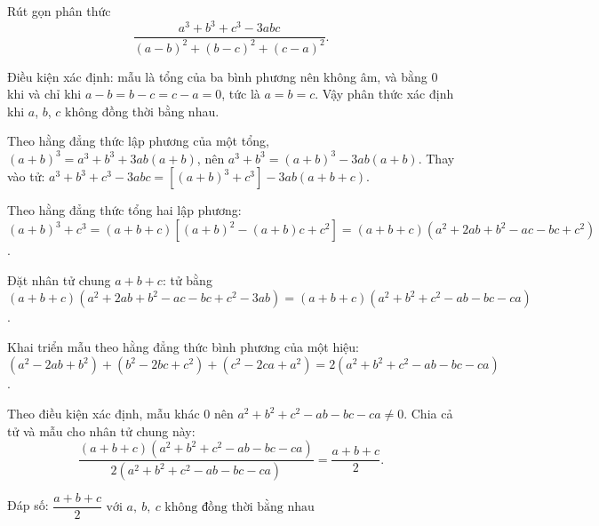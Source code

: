 \begin{problem}[8DS-PS-031]
Rút gọn phân thức
\[ \dfrac{a^3 + b^3 + c^3 - 3abc}{(a - b)^2 + (b - c)^2 + (c - a)^2}. \]

\begin{solution}
Điều kiện xác định: mẫu là tổng của ba bình phương nên không âm, và bằng $0$ khi và chỉ khi $a - b = b - c = c - a = 0$, tức là $a = b = c$. Vậy phân thức xác định khi $a$, $b$, $c$ không đồng thời bằng nhau.

Theo hằng đẳng thức lập phương của một tổng, $(a + b)^3 = a^3 + b^3 + 3ab(a + b)$, nên $a^3 + b^3 = (a + b)^3 - 3ab(a + b)$. Thay vào tử: $a^3 + b^3 + c^3 - 3abc = \left[(a + b)^3 + c^3\right] - 3ab(a + b + c)$.

Theo hằng đẳng thức tổng hai lập phương: $(a + b)^3 + c^3 = (a + b + c)\left[(a + b)^2 - (a + b)c + c^2\right] = (a + b + c)(a^2 + 2ab + b^2 - ac - bc + c^2)$.

Đặt nhân tử chung $a + b + c$: tử bằng $(a + b + c)(a^2 + 2ab + b^2 - ac - bc + c^2 - 3ab) = (a + b + c)(a^2 + b^2 + c^2 - ab - bc - ca)$.

Khai triển mẫu theo hằng đẳng thức bình phương của một hiệu: $(a^2 - 2ab + b^2) + (b^2 - 2bc + c^2) + (c^2 - 2ca + a^2) = 2(a^2 + b^2 + c^2 - ab - bc - ca)$.

Theo điều kiện xác định, mẫu khác $0$ nên $a^2 + b^2 + c^2 - ab - bc - ca \neq 0$. Chia cả tử và mẫu cho nhân tử chung này:
\[ \dfrac{(a + b + c)(a^2 + b^2 + c^2 - ab - bc - ca)}{2(a^2 + b^2 + c^2 - ab - bc - ca)} = \dfrac{a + b + c}{2}. \]

Đáp số: $\boxed{\dfrac{a + b + c}{2} \text{ với } a,\ b,\ c \text{ không đồng thời bằng nhau}}$
\end{solution}
\end{problem}


